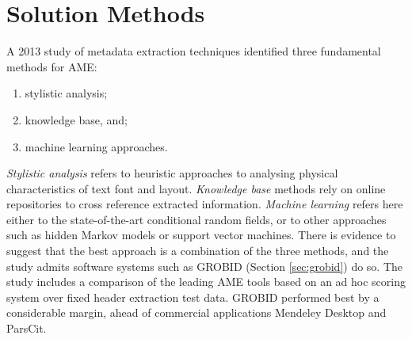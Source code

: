 \section{Solution Methods}

A 2013 study of metadata extraction techniques \cite{lipinski2013evaluation} identified three fundamental methods for AME:

\begin{enumerate}
\item stylistic analysis;
\item knowledge base, and;
\item machine learning approaches.
\end{enumerate}

\emph{Stylistic analysis} refers to heuristic approaches to analysing physical characteristics of text font and layout. \emph{Knowledge base} methods rely on online repositories to cross reference extracted information. \emph{Machine learning} refers here either to the state-of-the-art conditional random fields, or to other approaches such as hidden Markov models or support vector machines. There is evidence to suggest that the best approach is a combination of the three methods, and the study admits software systems such as GROBID (Section \ref{sec:grobid}) do so. The study includes a comparison of the leading AME tools based on an ad hoc scoring system over fixed header extraction test data. GROBID performed best by a considerable margin, ahead of commercial applications Mendeley Desktop and ParsCit.

